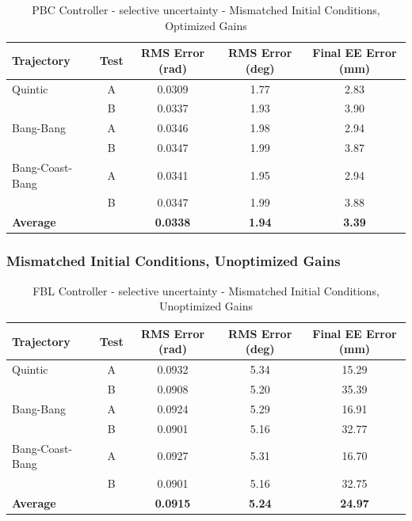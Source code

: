 \documentclass[11pt,a4paper]{article}
\begin{document}
\begin{table}[H]
\centering
\caption{PBC Controller - selective uncertainty - Mismatched Initial Conditions, Optimized Gains}
\begin{tabular}{lcccc}
\toprule
Trajectory & Test & RMS Error (rad) & RMS Error (deg) & Final EE Error (mm) \\
\midrule
Quintic & A & 0.0309 & 1.77 & 2.83 \\
 & B & 0.0337 & 1.93 & 3.90 \\
\midrule
Bang-Bang & A & 0.0346 & 1.98 & 2.94 \\
 & B & 0.0347 & 1.99 & 3.87 \\
\midrule
Bang-Coast-Bang & A & 0.0341 & 1.95 & 2.94 \\
 & B & 0.0347 & 1.99 & 3.88 \\
\midrule
\textbf{Average} & & \textbf{0.0338} & \textbf{1.94} & \textbf{3.39} \\
\bottomrule
\end{tabular}
\end{table}

\subsubsection{Mismatched Initial Conditions, Unoptimized Gains}

\begin{table}[H]
\centering
\caption{FBL Controller - selective uncertainty - Mismatched Initial Conditions, Unoptimized Gains}
\begin{tabular}{lcccc}
\toprule
Trajectory & Test & RMS Error (rad) & RMS Error (deg) & Final EE Error (mm) \\
\midrule
Quintic & A & 0.0932 & 5.34 & 15.29 \\
 & B & 0.0908 & 5.20 & 35.39 \\
\midrule
Bang-Bang & A & 0.0924 & 5.29 & 16.91 \\
 & B & 0.0901 & 5.16 & 32.77 \\
\midrule
Bang-Coast-Bang & A & 0.0927 & 5.31 & 16.70 \\
 & B & 0.0901 & 5.16 & 32.75 \\
\midrule
\textbf{Average} & & \textbf{0.0915} & \textbf{5.24} & \textbf{24.97} \\
\bottomrule
\end{tabular}
\end{table}
\end{document}
